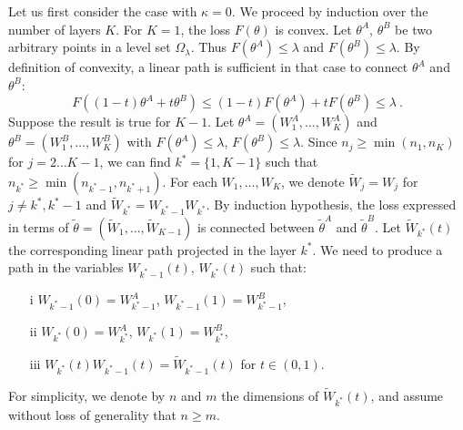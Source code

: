 Let us first consider the case with $\kappa =0$.
We proceed by induction over the number of layers $K$. 
For $K=1$, the loss $F(\theta)$ is convex. Let  $\theta^A$, $\theta^B$ be two arbitrary points 
in a level set $\Omega_\lambda$. Thus $F(\theta^A) \leq \lambda$ and $F(\theta^B) \leq \lambda$. By definition
of convexity, a linear path is sufficient in that case to connect $\theta^A$ and $\theta^B$:
$$F( (1-t) \theta^A + t \theta^B) \leq (1-t) F(\theta^A) + t F(\theta^B) \leq \lambda~.$$
Suppose the result is true for $K-1$. Let $\theta^A = (W_1^A, \dots, W^A_K)$ and 
 $\theta^B = (W_1^B, \dots, W^B_K)$ with $F(\theta^A) \leq \lambda$, $F(\theta^B) \leq \lambda$.
 Since $n_j \geq \min(n_1, n_K)$ for $j=2 \dots K-1$, we can find $k^*=\{1, K-1\}$ such that
 $n_{k^*} \geq \min(n_{k^*-1}, n_{k^*+1})$.
For each $W_1, \dots, W_K$, we denote $\tilde{W}_j = W_j$ for $j \neq k^*, k^*- 1$ and
$\tilde{W}_{k^*} = W_{k^*-1} W_{k^*}$. 
By induction hypothesis, the 
loss expressed in terms of $\tilde{\theta} = (\tilde{W}_1, \dots, \tilde{W}_{K-1})$ is connected 
between $\tilde{\theta}^A$ and $\tilde{\theta}^B$. Let $\tilde{W}_{k^*}(t)$ the corresponding 
linear path projected in the  layer $k^*$. 
We need to produce a path in the variables $W_{k^*-1}(t)$, $W_{k^*}(t)$ 
such that:
\begin{itemize}
\item[i] $W_{k^*-1}(0) = W_{k^*-1}^A$, $W_{k^*-1}(1) = W_{k^*-1}^B$, 
\item[ii] $W_{k^*}(0) = W_{k^*}^A$, $W_{k^*}(1) = W_{k^*}^B$,
\item[iii] $W_{k^*}(t) W_{k^*-1}(t) = \tilde{W}_{k^*-1}(t) $ for $t \in (0,1)$. 
\end{itemize} 

For simplicity, we denote by $n$ and $m$ the dimensions of $\tilde{W}_{k^*}(t)$, and 
assume without loss of generality that $n \geq m$. 

